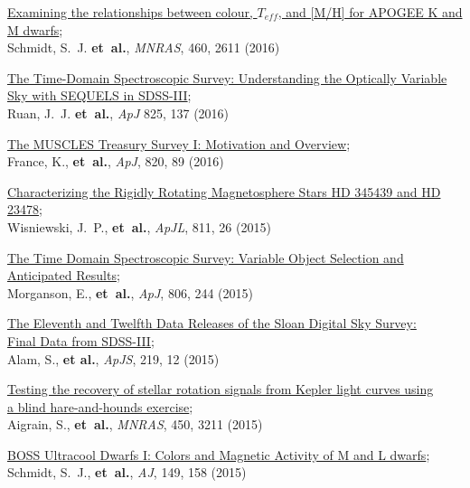 \begin{etaremune}[leftmargin=10pt]
\item{\sc \href{http://adsabs.harvard.edu/abs/2016MNRAS.460.2611S}{\color{NavyBlue}Examining the relationships between colour, $T_{eff}$, and [M/H] for APOGEE K and M dwarfs}};\\ Schmidt, S.~J. {\bf et~al.}, {\em MNRAS}, 460, 2611 (2016)

\item{\sc \href{http://arxiv.org/abs/1602.02752}{\color{NavyBlue}The Time-Domain Spectroscopic Survey: Understanding the Optically Variable Sky with SEQUELS in SDSS-III}};\\ Ruan, J.~J. {\bf et~al.}, {\em ApJ} 825, 137 (2016)

\item{\sc \href{http://adsabs.harvard.edu/abs/2016ApJ...820...89F}{\color{NavyBlue}The MUSCLES Treasury Survey I: Motivation and Overview}};\\ France, K., {\bf et~al.}, {\em ApJ}, 820, 89 (2016)

\item{\sc \href{http://arxiv.org/abs/1509.00128}{\color{NavyBlue}Characterizing the Rigidly Rotating Magnetosphere Stars HD 345439 and HD 23478}};\\
Wisniewski, J.~P., {\bf et~al.}, {\em ApJL}, 811, 26 (2015)

\item{\sc \href{http://arxiv.org/abs/1505.00760}{\color{NavyBlue}The Time Domain Spectroscopic Survey: Variable Object Selection and\\ Anticipated Results}};\\
Morganson, E., {\bf et~al.}, {\em ApJ}, 806, 244 (2015)

\item{\sc \href{http://adsabs.harvard.edu/abs/2015arXiv150100963A}{\color{NavyBlue}The Eleventh and Twelfth Data Releases of the Sloan Digital Sky Survey: \\ Final Data from SDSS-III}}; \\
Alam, S., {\bf et al.}, {\em ApJS}, 219, 12 (2015)

\item{\sc \href{http://adsabs.harvard.edu/abs/2015MNRAS.450.3211A}{\color{NavyBlue}Testing the recovery of stellar rotation signals from Kepler light curves using\\ a blind hare-and-hounds exercise}};\\
Aigrain, S., {\bf et~al.}, {\em MNRAS}, 450, 3211 (2015)

\item{\sc \href{http://adsabs.harvard.edu/abs/2015AJ....149..158S}{\color{NavyBlue}BOSS Ultracool Dwarfs I: Colors and Magnetic Activity of M and L dwarfs}};\\
Schmidt, S.~J., {\bf et~al.}, {\em AJ}, 149, 158 (2015)


\end{etaremune}
